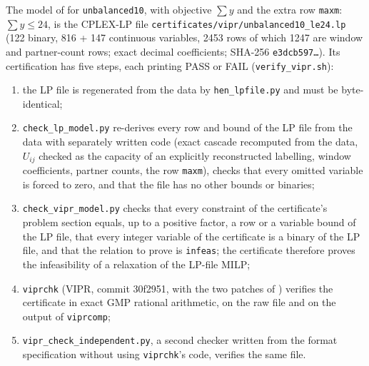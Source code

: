 \documentclass[11pt,a4paper]{report}
\newcommand*{\inst}[1]{\texttt{#1}}
\begin{document}
The model of  for \inst{unbalanced10}, with objective $\sum y$ and the extra row
\texttt{maxm}: $\sum y\le24$, is the CPLEX-LP file \texttt{certificates/vipr/unbalanced10\_le24.lp} (122 binary,
816 + 147 continuous variables, 2453 rows of which 1247 are window and partner-count rows; exact decimal
coefficients; SHA-256 \texttt{e3dcb597\ldots}). Its certification has five steps, each printing PASS or FAIL
(\texttt{verify\_vipr.sh}):
\begin{enumerate}
\item the LP file is regenerated from the data by \texttt{hen\_lpfile.py} and must be byte-identical;
\item \texttt{check\_lp\_model.py} re-derives every row and bound of the LP file from the data with separately
written code (exact cascade recomputed from the data, $U_{ij}$ checked as the capacity of an explicitly
reconstructed labelling, window coefficients, partner counts, the row \texttt{maxm}), checks that every omitted
variable is forced to zero, and that the file has no other bounds or binaries;
\item \texttt{check\_vipr\_model.py} checks that every constraint of the certificate's problem section equals, up to a
positive factor, a row or a variable bound of the LP file, that every integer variable of the certificate is a
binary of the LP file, and that the relation to prove is \texttt{infeas}; the certificate therefore proves the
infeasibility of a relaxation of the LP-file MILP;
\item \texttt{viprchk} (VIPR, commit 30f2951, with the two patches of ) verifies the certificate in
exact GMP rational arithmetic, on the raw file and on the output of \texttt{viprcomp};
\item \texttt{vipr\_check\_independent.py}, a second checker written from the format specification
\autocite{CheungGleixnerSteffy2017,VIPRtools} without using \texttt{viprchk}'s code, verifies the same file.
\end{enumerate}
\end{document}

